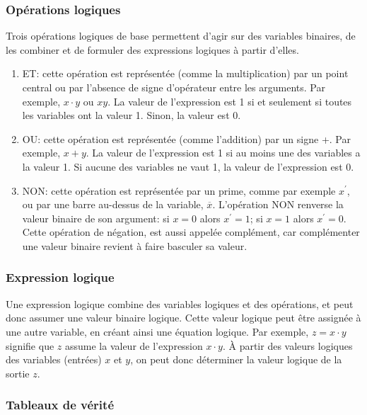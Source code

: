\documentclass[11pt]{article}
\begin{document}
\subsubsection{Opérations logiques}
\label{sec:org0505dbe}

Trois opérations logiques de base permettent d'agir sur des variables
binaires, de les combiner et de formuler des expressions logiques à
partir d'elles.

\begin{enumerate}
\item ET: cette opération est représentée (comme la multiplication) par
un point central ou par l'absence de signe d'opérateur entre les
arguments. Par exemple, \(x \cdot y\) ou \(x y\). La valeur de
l'expression est 1 si et seulement si toutes les variables ont la
valeur 1. Sinon, la valeur est 0.
\item OU: cette opération est représentée (comme l'addition) par un signe
+. Par exemple, \(x + y\). La valeur de l'expression est 1 si au
moins une des variables a la valeur 1. Si aucune des variables ne
vaut 1, la valeur de l'expression est 0.
\item NON: cette opération est représentée par un prime, comme par
exemple \(x^\prime\), ou par une barre au-dessus de la variable,
\(\overline{x}\).  L'opération NON renverse la valeur binaire de
son argument: si \(x =0\) alors \(x^ \prime = 1\); si \(x =1\)
alors \(x^ \prime = 0\). Cette opération de négation, est aussi
appelée complément, car complémenter une valeur binaire revient à
faire basculer sa valeur.
\end{enumerate}

\subsubsection{Expression logique}
\label{sec:org0f867c4}

Une expression logique combine des variables logiques et des
opérations, et peut donc assumer une valeur binaire logique. Cette
valeur logique peut être assignée à une autre variable, en créant
ainsi une équation logique. Par exemple, \(z = x \cdot y\) signifie
que \(z\) assume la valeur de l'expression \(x \cdot y\). À partir des
valeurs logiques des variables (entrées) \(x\) et \(y\), on peut donc
déterminer la valeur logique de la sortie \(z\).

\subsubsection{Tableaux de vérité}
\label{sec:org848c7bc}
\end{document}
